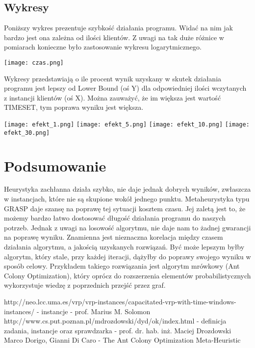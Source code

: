 \documentclass[a4paper]{article}
\begin{document}
\subsection{Wykresy}
Poniższy wykres prezentuje szybkość działania programu. Widać na nim jak bardzo jest ona zależna od ilości klientów. Z uwagi na tak duże różnice w pomiarach konieczne było zastosowanie wykresu logarytmicznego.
\begin{center}
\texttt{[image: czas.png]}
\end{center}
\newpage
Wykresy przedstawiają o ile procent wynik uzyskany w skutek działania programu jest lepszy od Lower Bound (oś Y) dla odpowiedniej ilości wczytanych z instancji klientów (oś X). Można zauważyć, że im większa jest wartość TIMESET, tym poprawa wyniku jest większa.
\begin{center}
\texttt{[image: efekt\_1.png]}
\texttt{[image: efekt\_5.png]}
\texttt{[image: efekt\_10.png]}
\texttt{[image: efekt\_30.png]}
\end{center}


\section{Podsumowanie}
Heurystyka zachłanna działa szybko, nie daje jednak dobrych wyników, zwłaszcza w instancjach, które nie są skupione wokół jednego punktu. Metaheurystyka typu GRASP daje szansę na poprawę tej sytuacji kosztem czasu. Jej zaletą jest to, że możemy bardzo łatwo dostosować długość działania programu do naszych potrzeb. Jednak z uwagi na losowość algorytmu, nie daje nam to żadnej gwarancji na poprawę wyniku. Znamienna jest nieznaczna korelacja między czasem działania algorytmu, a jakością uzyskanych rozwiązań. Być może lepszym byłby algorytm, który stale, przy każdej iteracji, dążyłby do poprawy swojego wyniku w sposób celowy. Przykładem takiego rozwiązania jest algorytm mrówkowy\cite{dorigo} (Ant Colony Optimization), który oprócz do rozszerzenia elementów probabilistycznych wykorzystuje wiedzę z poprzednich przejść przez graf.

\begin{thebibliography}{3}
 http://neo.lcc.uma.es/vrp/vrp-instances/capacitated-vrp-with-time-windows-instances/ - instancje - prof. Marius M. Solomon
 http://www.cs.put.poznan.pl/mdrozdowski/dyd/ok/index.html - definicja zadania, instancje oraz sprawdzarka - prof. dr. hab. inż. Maciej Drozdowski
 Marco Dorigo, Gianni Di Caro - The Ant Colony Optimization Meta-Heuristic
\end{thebibliography}
\pagebreak
\tableofcontents
\end{document}
